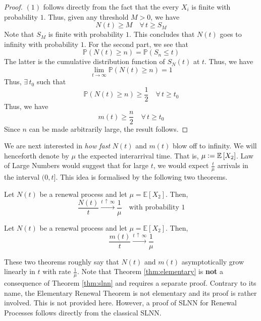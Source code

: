 \documentclass[12pt]{article}
\def\P{\mathbb{P}}
\theoremstyle{definition}
\begin{document}
\begin{proof}
    $(1)$ follows directly from the fact that the every  $X_i$ is finite with probability $1$. Thus, given any threshold $M > 0$, we have 
    \[
        N(t) \geq M \quad \forall \, t \geq S_M
    \]
    Note that $S_M$ is finite with probability $1$. This concludes that $N(t)$ goes to infinity with probability $1$. For the second part, we see that
    \[
        \P \left( N(t) \geq n \right) = \P \left( S_n \leq t \right)
    \]
    The latter is the cumulative distribution function of $S_N(t)$ at $t$. Thus, we have
    \[
        \lim_{t \to \infty} \P \left( N(t) \geq n \right) = 1
    \]
    Thus, $\exists \, t_0$ such that 
    \[
        \P \left( N(t) \geq n \right) \geq \frac{1}{2} \quad \forall \, t \geq t_0
    \]
    Thus, we have
    \[
        m(t) \geq \frac{n}{2} \quad \forall \, t \geq t_0
    \]
    Since $n$ can be made arbitrarily large, the result follows.
\end{proof}

We are next interested in \emph{how fast} $N(t)$ and $m(t)$ blow off to infinity. We will henceforth denote by $\mu$ the expected interarrival time. That is, $\mu \vcentcolon= \mathbb{E} \left[ X_2 \right]$. Law of Large Numbers would suggest that for large $t$, we would expect $\frac{t}{\mu}$ arrivals in the interval $(0,t]$. This idea is formalised by the following two theorems. 

\begin{thm} \label{thm:slnn}
    Let $N(t)$ be a renewal process and let $\mu = \mathbb{E} \left[ X_2 \right]$. Then, 
    \[
        \frac{N(t)}{t} \xrightarrow[]{t \, \uparrow \, \infty} \frac{1}{\mu} \quad \text{with probability } 1
    \]  
\end{thm}

\begin{thm} \label{thm:elementary}
    Let $N(t)$ be a renewal process and let $\mu = \mathbb{E} \left[ X_2 \right]$. Then, 
    \[
        \frac{m(t)}{t} \xrightarrow[]{t \, \uparrow \, \infty} \frac{1}{\mu}
    \]
\end{thm}

These two theorems roughly say that $N(t)$ and $m(t)$ asymptotically grow linearly in $t$ with rate $\frac{1}{\mu}$. Note that Theorem \ref{thm:elementary} is \textbf{not} a consequence of Theorem \ref{thm:slnn} and requires a separate proof. Contrary to its name, the Elementary Renewal Theorem is not elementary and its proof is rather involved. This is not provided here. However, a proof of SLNN for Renewal Processes follows directly from the classical SLNN. 
\end{document}
